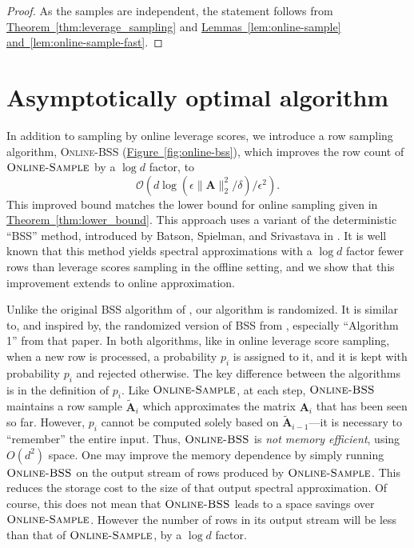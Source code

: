 \documentclass[11pt]{article}
\numberwithin{equation}{section}
\theoremstyle{definition}
\theoremstyle{plain}
\newcommand{\expref}[2]{\hyperref[#2]{#1~\ref{#2}}}
\newcommand{\Oh}{\ensuremath{\mathcal{O}}}
\newcommand{\bv}[1]{\mathbf{#1}}
\newcommand{\norm}[1]{\|#1\|}
\begin{document}
\begin{proof}
  As the samples are independent, the statement follows from \expref{Theorem}{thm:leverage_sampling} and \expref{Lemmas}{lem:online-sample}
\expref{and}{lem:online-sample-fast}.
\end{proof}

\section{Asymptotically optimal algorithm}
\label{sec:bss}
In addition to sampling by online leverage scores, we introduce a row sampling algorithm,  %
\textsc{Online-BSS} (\expref{Figure}{fig:online-bss}), which improves the row count of $\textsc{Online-Sample}$ by a  $\log d$ factor, to
%
\[
  \Oh(d \log(\epsilon\norm{\bv{A}}_2^2/\delta)/\epsilon^2).
\]
This improved bound matches the lower bound for online sampling given
in \expref{Theorem}{thm:lower_bound}. This approach uses a variant of
the deterministic ``BSS'' method, introduced by Batson, Spielman, and
Srivastava in \cite{batson2012twice}. It is well known that this
method yields spectral approximations with a $\log d$ factor fewer
rows than leverage scores sampling in the offline setting, and we show
that this improvement extends to online approximation.

Unlike the original BSS algorithm of \cite{batson2012twice}, our algorithm is randomized. 
It is similar to, and inspired by, the randomized version of BSS from \cite{lee2015linear}, especially ``Algorithm 1'' from that paper. In both algorithms, like in online leverage score sampling, when a new row is processed, a probability $p_i$ is assigned to it, and it is kept with probability $p_i$ and rejected otherwise. The key difference between the algorithms is in the definition of $p_i$. Like $\textsc{Online-Sample}$, at each step, $\textsc{Online-BSS}$ maintains a row sample $\bv{\tilde A}_i$ which approximates the matrix $\bv{A}_i$ that has been seen so far. However,  $p_i$ cannot be computed solely based on $\bv{\tilde A}_{i-1}$---it is necessary to ``remember'' the entire input.  Thus, $\textsc{Online-BSS}$ is \emph{not memory efficient}, using $O(d^2)$ space.  One may improve the memory dependence by simply running $\textsc{Online-BSS}$ on the output stream of rows produced by $\textsc{Online-Sample}$.  This reduces the storage cost to the size of that output spectral approximation.  Of course, this does not mean that $\textsc{Online-BSS}$ leads to a space savings over $\textsc{Online-Sample}$. However the number of rows in its output stream will be less than that of $\textsc{Online-Sample}$, by a $\log d$ factor. %
\end{document}
